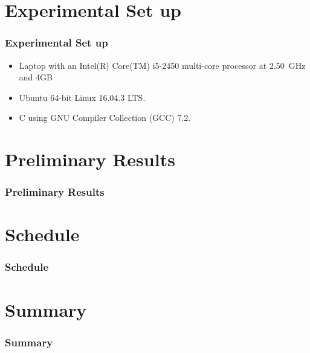 \documentclass[ignorenonframetext]{beamer}
\begin{document}
	\section{Experimental Set up}
	\begin{frame}
		\frametitle{Experimental Set up}
		\begin{itemize}
			\item Laptop with an Intel(R) Core(TM) i5-2450 multi-core processor at 2.50~GHz and 4GB
			\item Ubuntu 64-bit Linux 16.04.3 LTS.
			\item C using GNU Compiler Collection (GCC) 7.2.
		\end{itemize}
	\end{frame}
	
	\section{Preliminary Results}
	\begin{frame}
		\frametitle{Preliminary Results}
		
	\end{frame}

	\section{Schedule}
	\begin{frame}
		\frametitle{Schedule}		

	\end{frame}
	
	\section{Summary}
	\begin{frame}
		\frametitle{Summary}
			
	\end{frame}
	
\end{document}
